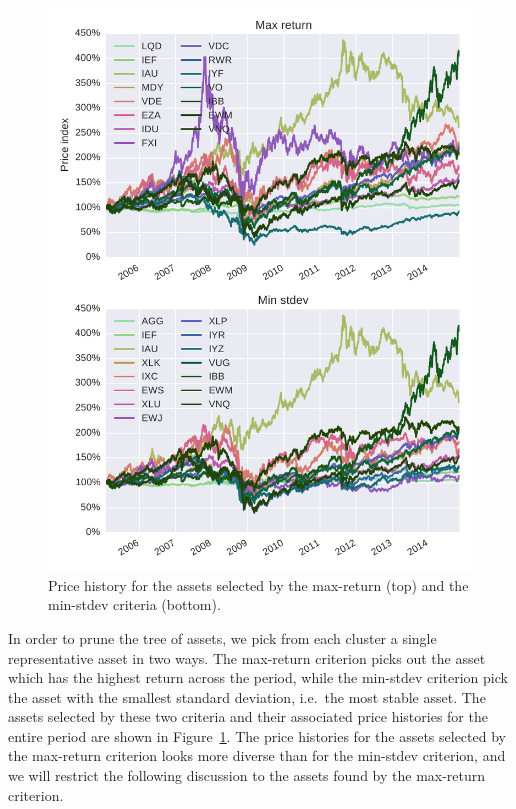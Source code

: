 \begin{figure}[tp]
\centering
\includegraphics{../pic/prices_selected_assets.pdf}
\caption{Price history for the assets selected by the max-return (top) and the min-stdev criteria (bottom).}
\label{fig:prices_selected}
\end{figure}

In order to prune the tree of assets, we pick from each cluster a single representative asset in two ways.
The max-return criterion picks out the asset which has the highest return across the period, while the min-stdev criterion pick the asset with the smallest standard deviation, i.e.\ the most stable asset.
The assets selected by these two criteria and their associated price histories for the entire period are shown in Figure~\ref{fig:prices_selected}.
The price histories for the assets selected by the max-return criterion looks more diverse than for the min-stdev criterion, and we will restrict the following discussion to the assets found by the max-return criterion.